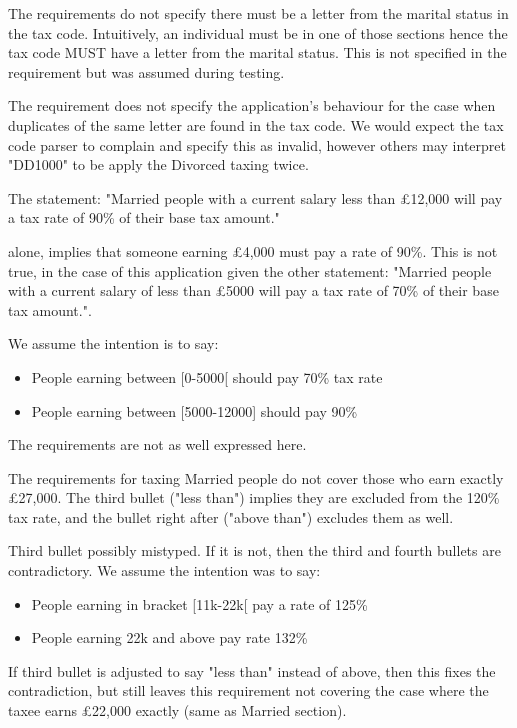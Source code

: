 The requirements do not specify there must be a letter from the marital status in the tax code. Intuitively, an individual must be in one of those sections hence the tax code MUST have a letter from the marital status. This is not specified in the requirement but was assumed during testing. 

The requirement does not specify the application's behaviour for the case when duplicates of the same letter are found in the tax code. We would expect the tax code parser to complain and specify this as invalid, however others may interpret "DD1000" to be apply the Divorced taxing twice. 


The statement: "Married people with a current salary less than £12,000 will pay a tax rate of 90\% of their base tax amount."

alone, implies that someone earning £4,000 must pay a rate of 90\%. This is not true, in the case of this application given the other statement: "Married people with a current salary of less than £5000 will pay a tax rate of 70\% of their base tax amount.". 

We assume the intention is to say: 

\begin{itemize}
	\item People earning between [0-5000[ should pay 70\% tax rate 
	\item People earning between [5000-12000] should pay 90\%
\end{itemize}

The requirements are not as well expressed here. 

The requirements for taxing Married people do not cover those who earn exactly £27,000. The third bullet ("less than") implies they are excluded from the 120\% tax rate, and the bullet right after ("above than") excludes them as well. 

Third bullet possibly mistyped. If it is not, then the third and fourth bullets are contradictory. We assume the intention was to say:  

\begin{itemize}
	\item People earning in bracket [11k-22k[ pay a rate of 125\%
	\item People earning 22k and above pay rate 132\%
\end{itemize}

If third bullet is adjusted to say "less than" instead of above, then this fixes the contradiction, but still leaves this requirement not covering the case where the taxee earns £22,000 exactly (same as Married section). 


